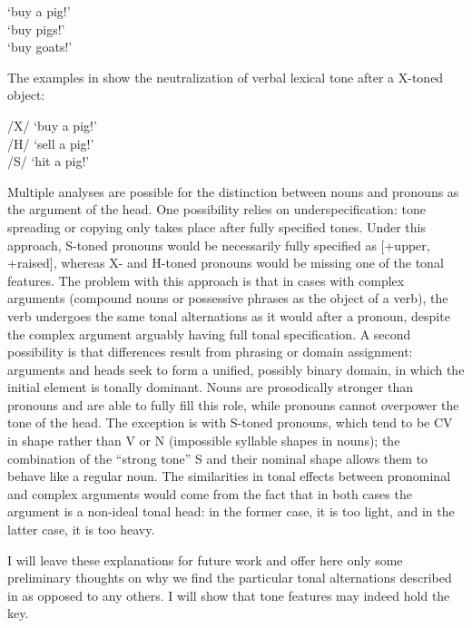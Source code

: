 \documentclass[output=paper]{langsci/langscibook}
\begin{document}
\ea\label{ex:mcpherson:20} 
\ea\label{ex:mcpherson:20a} { } `buy a pig!' \\
\ex\label{ex:mcpherson:20b} { } `buy pigs!' \\
\ex\label{ex:mcpherson:20c} { } `buy goats!' \\
\z
\z

The examples in  show the neutralization of verbal lexical tone after a X-toned object:

\ea\label{ex:mcpherson:21} 
\ea\label{ex:mcpherson:21a} /X/ { } `buy a pig!' \\
\ex\label{ex:mcpherson:21b} /H/ { } `sell a pig!' \\
\ex\label{ex:mcpherson:21c} /S/ { } `hit a pig!' \\
\z
\z

Multiple analyses are possible for the distinction between nouns and pronouns as the argument of the head. One possibility relies on underspecification: tone spreading or copying only takes place after fully specified tones. Under this approach, S-toned pronouns would be necessarily fully specified as [+upper, +raised], whereas X- and H-toned pronouns would be missing one of the tonal features. The problem with this approach is that in cases with complex arguments (compound nouns or possessive phrases as the object of a verb), the verb undergoes the same tonal alternations as it would after a pronoun, despite the complex argument arguably having full tonal specification. A second possibility is that differences result from phrasing or domain assignment: arguments and heads seek to form a unified, possibly binary domain, in which the initial element is tonally dominant. Nouns are prosodically stronger than pronouns and are able to fully fill this role, while pronouns cannot overpower the tone of the head. The exception is with S-toned pronouns, which tend to be CV in shape rather than V or N (impossible syllable shapes in nouns); the combination of the ``strong tone'' S and their nominal shape allows them to behave like a regular noun. The similarities in tonal effects between pronominal and complex arguments would come from the fact that in both cases the argument is a non-ideal tonal head: in the former case, it is too light, and in the latter case, it is too heavy.

I will leave these explanations for future work and offer here only some preliminary thoughts on why we find the particular tonal alternations described in  as opposed to any others. I will show that tone features may indeed hold the key.
\end{document}
